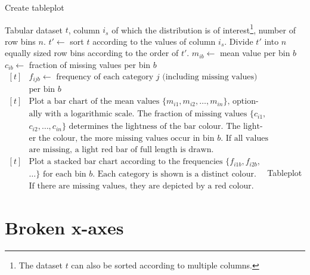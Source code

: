 \documentclass[11pt, fleqn, a4paper]{article}\usepackage[]{graphicx}\usepackage[]{color}
\begin{document}
\begin{algorithm}[h]
\caption{Create tableplot}\label{alg}
\begin{minipage}{0.8\textwidth}
\begin{algorithmic}[1]
\Require Tabular dataset $t$, column $i_s$ of which the distribution is of interest\footnote{The dataset $t$ can also be sorted according to multiple columns.}, number of row bins $n$.
\State $t'\leftarrow$ sort $t$ according to the values of column $i_s$.
\State Divide $t'$ into $n$ equally sized row bins according to the order of $t'$.
\State $m_{ib}\leftarrow$ mean value per bin $b$
\State $c_{ib}\leftarrow$ fraction of missing values per bin $b$
\EndIf
{}
\State $\begin{aligned}[t]
		&\mbox{$f_{ijb}\leftarrow$ frequency of each category $j$ (including missing values)}\\[-3pt]
		&\mbox{per bin $b$}
	\end{aligned}$
\EndIf
\EndFor
{}
\State $\begin{aligned}[t]
		&\mbox{Plot a bar chart of the mean values $\{m_{i1}, m_{i2},\ldots, m_{in}\}$, option-}\\[-3pt]
		&\mbox{ally with a logarithmic scale. The fraction of missing values $\{c_{i1},$}\\[-3pt]
		&\mbox{$c_{i2},\ldots, c_{in}\}$ determines the lightness of the bar colour. The light-}\\[-3pt]
		&\mbox{er the colour, the more missing values occur in bin $b$. If all values}\\[-3pt]
		&\mbox{are missing, a light red bar of full length is drawn.}
	\end{aligned}$
\EndIf
{}
\State $\begin{aligned}[t]
		&\mbox{Plot a stacked bar chart according to the frequencies $\{f_{i1b}, f_{i2b},$}\\[-3pt]
		&\mbox{$\ldots\}$ for each bin $b$. Each category is shown is a distinct colour.}\\[-3pt]
		&\mbox{If there are missing values, they are depicted by a red colour.}
	\end{aligned}$
\EndIf
\EndFor
\Ensure Tableplot
\end{algorithmic}
\end{minipage}
\end{algorithm}

\newpage
\section{Broken x-axes}\label{secbrokenx}
\end{document}
